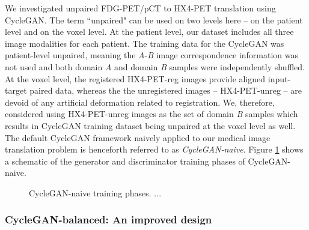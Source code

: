We investigated unpaired FDG-PET/pCT to HX4-PET translation using CycleGAN. The term ``unpaired" can be used on two levels here -- on the patient level and on the voxel level. At the patient level, our dataset includes all three image modalities for each patient. The training data for the CycleGAN was patient-level unpaired, meaning the \textit{A}-\textit{B} image correspondence information was not used and both domain \textit{A} and domain \textit{B} samples were independently shuffled. At the voxel level, the registered HX4-PET-reg images provide aligned input-target paired data, whereas the the unregistered images -- HX4-PET-unreg -- are devoid of any artificial deformation related to registration. We, therefore, considered using HX4-PET-unreg images as the set of domain \textit{B} samples which results in CycleGAN training dataset being unpaired at the voxel level as well. The default CycleGAN framework naively applied to our medical image translation problem is henceforth referred to as \textit{CycleGAN-naive}. Figure \ref{fig:cyclegan_naive} shows a schematic of the generator and discriminator training phases of CycleGAN-naive.


\begin{figure}[h!]
    \centering
    \caption{CycleGAN-naive training phases. ...}
    \label{fig:cyclegan_naive}
\end{figure}{}



\subsubsection{CycleGAN-balanced: An improved design}

